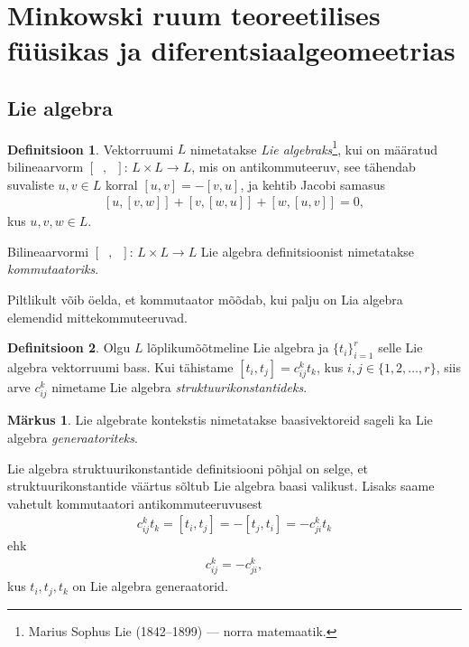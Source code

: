 \documentclass[12pt,a4paper,oneside]{article}
\theoremstyle{plain}
\theoremstyle{definition}
\newtheorem{definitsioon}{Definitsioon}[section]
\newtheorem{markus}{Märkus}[section]
\numberwithin{equation}{section}
\begin{document}
\newpage
\section[Minkowski ruum teoreetilises füüsikas ja 
diferentsiaalgeomeetrias]{Minkowski ruum teoreetilises 
füüsikas ja \newline diferentsiaalgeomeetrias}

\subsection{Lie algebra}

\begin{definitsioon} \label{def:lie-algebra}
Vektorruumi $L$ nimetatakse \emph{Lie algebraks}\footnote{
Marius Sophus Lie (1842--1899) --- norra matemaatik.}, kui on 
määratud bilineaarvorm $\left[\phantom{u},\phantom{u}\right] \colon\, 
L \times L \rightarrow L$, mis on antikommuteeruv, see tähendab 
suvaliste $u, v \in L$ korral 
$\left[u, v\right] = - \left[v, u\right]$,
ja kehtib Jacobi samasus 
\begin{align*}
\left[u, \left[v, w\right]\right] + 
\left[v, \left[w, u\right]\right] + 
\left[w, \left[u, v\right]\right] = 0,
\end{align*}
kus $u, v, w \in L$.
\end{definitsioon}

Bilineaarvormi $\left[\phantom{u}, \phantom{u}\right] \colon\, 
L \times L \rightarrow L$ Lie algebra definitsioonist nimetatakse 
\emph{kommutaatoriks}.

Piltlikult võib öelda, et kommutaator mõõdab, kui palju on Lia 
algebra elemendid mittekommuteeruvad.

\begin{definitsioon}
Olgu $L$ lõplikumõõtmeline Lie algebra ja $\{t_i\}_{i = 1}^{r}$ 
selle Lie algebra vektorruumi bass. Kui tähistame 
$\left[t_i, t_j\right] = c_{ij}^{k} t_{k}$, kus 
$i,j \in \{1, 2, \ldots, r\}$, siis arve $c_{ij}^{k}$ nimetame Lie 
algebra \emph{struktuurikonstantideks}.
\end{definitsioon}

\begin{markus}
Lie algebrate kontekstis nimetatakse baasivektoreid sageli ka 
Lie algebra \emph{generaatoriteks}.
\end{markus}

Lie algebra struktuurikonstantide definitsiooni põhjal on selge, et 
struktuurikonstantide väärtus sõltub Lie algebra baasi valikust. 
Lisaks saame vahetult kommutaatori antikommuteeruvusest
\begin{align*}
c_{ij}^{k} t_k = \left[t_i, t_j\right] = - \left[t_j, t_i\right] = 
-c_{ji}^{k} t_k
\end{align*}
ehk
\begin{align} \label{eq:struktuurikonst-antikomm}
c_{ij}^{k} = -c_{ji}^{k},
\end{align}
kus $t_i, t_j, t_k$ on Lie algebra generaatorid.
\end{document}

